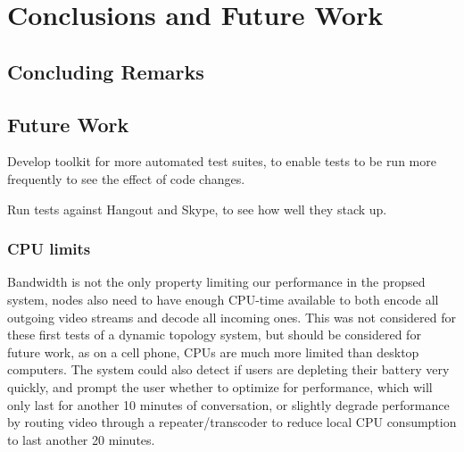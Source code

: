 \chapter{Conclusions and Future Work}\label{chp:conclusions}


\section{Concluding Remarks}\label{sec:conclusions}



\section{Future Work}\label{sec:future_work}

Develop toolkit for more automated test suites, to enable tests to be run more frequently to see the effect of code changes.

Run tests against Hangout and Skype, to see how well they stack up.

\subsection{CPU limits}

Bandwidth is not the only property limiting our performance in the propsed system, nodes also need to have enough CPU-time available to both encode all outgoing video streams and decode all incoming ones. This was not considered for these first tests of a dynamic topology system, but should be considered for future work, as on a cell phone, CPUs are much more limited than desktop computers. The system could also detect if users are depleting their battery very quickly, and prompt the user whether to optimize for performance, which will only last for another 10 minutes of conversation, or slightly degrade performance by routing video through a repeater/transcoder to reduce local CPU consumption to last another 20 minutes.




